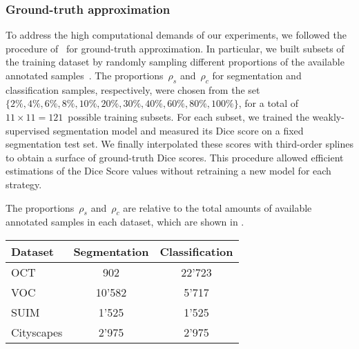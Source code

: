 \subsubsection{Ground-truth approximation}
To address the high computational demands of our experiments, we followed the procedure of~ for ground-truth approximation. 
In particular, we built subsets of the training dataset by randomly sampling different proportions of the available annotated samples~. The proportions~$\rho_s$ and~$\rho_c$ for segmentation and classification samples, respectively, were chosen from the set~$\{2\%, 4\%, 6\%, 8\%, 10\%, 20\%, 30\%, 40\%, 60\%,\allowbreak 80\%, 100\%\}$, for a total of $11\times{}11=121$~possible training subsets. For each subset, we trained the weakly-supervised segmentation model and measured its Dice score on a fixed segmentation test set. We finally interpolated these scores with third-order splines to obtain a surface of ground-truth Dice scores. This procedure allowed efficient estimations of the Dice Score values without retraining a new model for each strategy.

The proportions~$\rho_s$ and~$\rho_c$ are relative to the total amounts of available annotated samples in each dataset, which are shown in .

\begin{table}[h]
\centering
{}
\begin{tabular}{lcc}
\hline
\textbf{Dataset} & \textbf{Segmentation} & \textbf{Classification} \\ \hline
OCT & 902 & 22'723 \\
VOC & 10'582 & 5'717 \\
SUIM & 1'525 & 1'525 \\
Cityscapes & 2'975 & 2'975 \\ \hline
\end{tabular}

\end{table}
